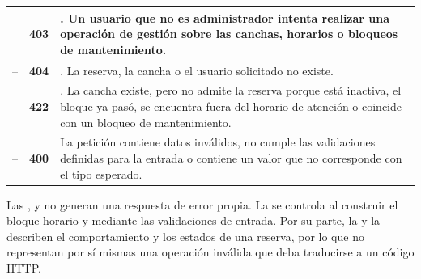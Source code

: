 \begin{xltabular}{\textwidth}{C{1.6cm} C{2.4cm} L{8.6cm}}
     &
    \textbf{403} &
    . Un usuario que no es administrador
    intenta realizar una operación de gestión sobre las canchas, horarios o
    bloqueos de mantenimiento. \\

    \midrule

    -- &
    \textbf{404} &
    . La reserva, la cancha o el usuario solicitado no existe. \\

    -- &
    \textbf{422} &
    . La cancha existe, pero no admite la reserva
    porque está inactiva, el bloque ya pasó, se encuentra fuera del horario de
    atención o coincide con un bloqueo de mantenimiento. \\

    -- &
    \textbf{400} &
    La petición contiene datos inválidos, no cumple las validaciones definidas
    para la entrada o contiene un valor que no corresponde con el tipo
    esperado. \\

    \bottomrule
\end{xltabular}

Las ,  y  no generan una respuesta de error propia.
La  se controla al construir el bloque horario y mediante las
validaciones de entrada. Por su parte, la  y la  describen el
comportamiento y los estados de una reserva, por lo que no representan por sí
mismas una operación inválida que deba traducirse a un código HTTP.

